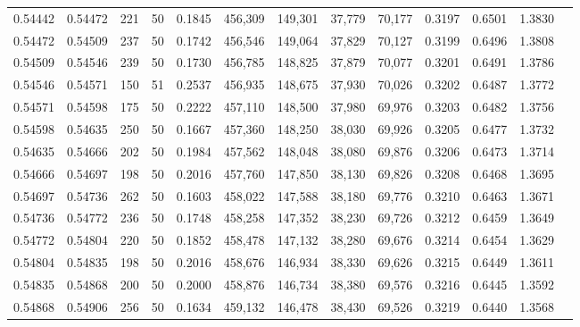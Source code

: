 \begin{tabular}{rrrrrrrrrrrrr}
0.54442 & 0.54472 &   221 &  50 &                                     0.1845 & 456,309 & 149,301 &  37,779 &  70,177 & 0.3197 & 0.6501 & 1.3830 \\
0.54472 & 0.54509 &   237 &  50 &                                     0.1742 & 456,546 & 149,064 &  37,829 &  70,127 & 0.3199 & 0.6496 & 1.3808 \\
0.54509 & 0.54546 &   239 &  50 &                                     0.1730 & 456,785 & 148,825 &  37,879 &  70,077 & 0.3201 & 0.6491 & 1.3786 \\
0.54546 & 0.54571 &   150 &  51 &                                     0.2537 & 456,935 & 148,675 &  37,930 &  70,026 & 0.3202 & 0.6487 & 1.3772 \\
0.54571 & 0.54598 &   175 &  50 &                                     0.2222 & 457,110 & 148,500 &  37,980 &  69,976 & 0.3203 & 0.6482 & 1.3756 \\
0.54598 & 0.54635 &   250 &  50 &                                     0.1667 & 457,360 & 148,250 &  38,030 &  69,926 & 0.3205 & 0.6477 & 1.3732 \\
0.54635 & 0.54666 &   202 &  50 &                                     0.1984 & 457,562 & 148,048 &  38,080 &  69,876 & 0.3206 & 0.6473 & 1.3714 \\
0.54666 & 0.54697 &   198 &  50 &                                     0.2016 & 457,760 & 147,850 &  38,130 &  69,826 & 0.3208 & 0.6468 & 1.3695 \\
0.54697 & 0.54736 &   262 &  50 &                                     0.1603 & 458,022 & 147,588 &  38,180 &  69,776 & 0.3210 & 0.6463 & 1.3671 \\
0.54736 & 0.54772 &   236 &  50 &                                     0.1748 & 458,258 & 147,352 &  38,230 &  69,726 & 0.3212 & 0.6459 & 1.3649 \\
0.54772 & 0.54804 &   220 &  50 &                                     0.1852 & 458,478 & 147,132 &  38,280 &  69,676 & 0.3214 & 0.6454 & 1.3629 \\
0.54804 & 0.54835 &   198 &  50 &                                     0.2016 & 458,676 & 146,934 &  38,330 &  69,626 & 0.3215 & 0.6449 & 1.3611 \\
0.54835 & 0.54868 &   200 &  50 &                                     0.2000 & 458,876 & 146,734 &  38,380 &  69,576 & 0.3216 & 0.6445 & 1.3592 \\
0.54868 & 0.54906 &   256 &  50 &                                     0.1634 & 459,132 & 146,478 &  38,430 &  69,526 & 0.3219 & 0.6440 & 1.3568 \\

\end{tabular}
